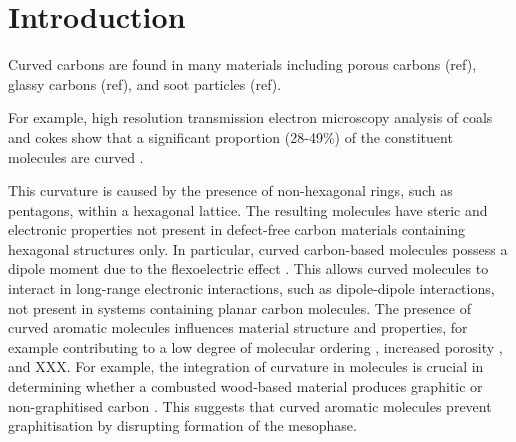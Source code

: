 

%
\section{Introduction}
\label{sec:Introduction}

Curved carbons are found in many materials including porous carbons (ref), glassy carbons (ref), and soot particles (ref).

For example, high resolution transmission electron microscopy analysis of coals and cokes show that a significant proportion (28-49\%) of the constituent molecules are curved \cite{wang2017improved,zhong2018structural}. %


This curvature is caused by the presence of non-hexagonal rings, such as pentagons, within a hexagonal lattice. The resulting molecules have steric and electronic properties not present in defect-free carbon materials containing hexagonal structures only. In particular, curved carbon-based molecules possess a dipole moment due to the flexoelectric effect \cite{Martin2017}. This allows curved molecules to interact in long-range electronic interactions, such as dipole-dipole interactions, not present in systems containing planar carbon molecules.
The presence of curved aromatic molecules influences material structure and properties, for example contributing to a low degree of molecular ordering %
\cite{zhong2018structural}, increased porosity \cite{zhang2020molecular}, %
and XXX. For example, the integration of curvature in molecules is crucial in determining whether a combusted wood-based material produces graphitic or non-graphitised carbon \cite{abrahamson2018carbon}. This suggests that curved aromatic molecules prevent graphitisation by disrupting formation of the mesophase. %


